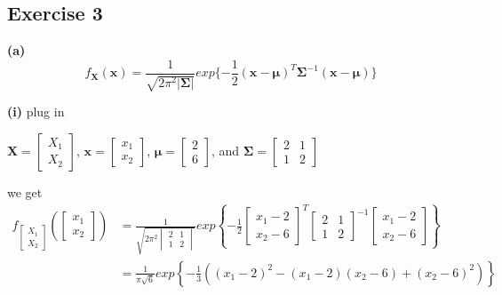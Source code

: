 \documentclass[11pt]{article}
\begin{document}
\subsection*{Exercise 3}

\noindent\textbf{(a)}
$$f_\textbf{X}(\textbf{x})=\frac{1}{\sqrt{2\pi^2|\pmb{\Sigma}|}}exp\{-\frac{1}{2}(\textbf{x}-\pmb{\mu})^T\pmb{\Sigma}^{-1}(\textbf{x}-\pmb{\mu})\}$$

\noindent\textbf{(i)}
plug in\\

\begin{center}
$\textbf{X}=\begin{bmatrix} X_1 \\ X_2 \end{bmatrix}$, 
$\textbf{x}=\begin{bmatrix} x_1 \\ x_2 \end{bmatrix}$,
$\pmb{\mu}=\begin{bmatrix} 2 \\ 6 \end{bmatrix}$,
  and  $\pmb{\Sigma}=\begin{bmatrix} 2 & 1 \\ 1 & 2 \end{bmatrix} $
\end{center}

we get\\
\begin{equation}
\begin{split}
f_{\begin{bmatrix} X_1 \\ X_2 \end{bmatrix}}\left(\begin{bmatrix} x_1 \\ x_2 \end{bmatrix}\right)&=\frac{1}{\sqrt{2\pi^2\begin{vmatrix} 2 & 1 \\ 1 & 2 \end{vmatrix}}}exp\left\{-\frac{1}{2}\begin{bmatrix} x_1-2 \\ x_2-6 \end{bmatrix}^T\begin{bmatrix} 2 & 1 \\ 1 & 2 \end{bmatrix}^{-1}\begin{bmatrix} x_1-2 \\ x_2-6 \end{bmatrix}\right\}\\
&=\frac{1}{\pi\sqrt{6}}exp\left\{-\frac{1}{3}\left((x_1-2)^2-(x_1-2)(x_2-6)+(x_2-6)^2\right)\right\}\\
\end{split}
\end{equation}
\pagebreak
\end{document}
